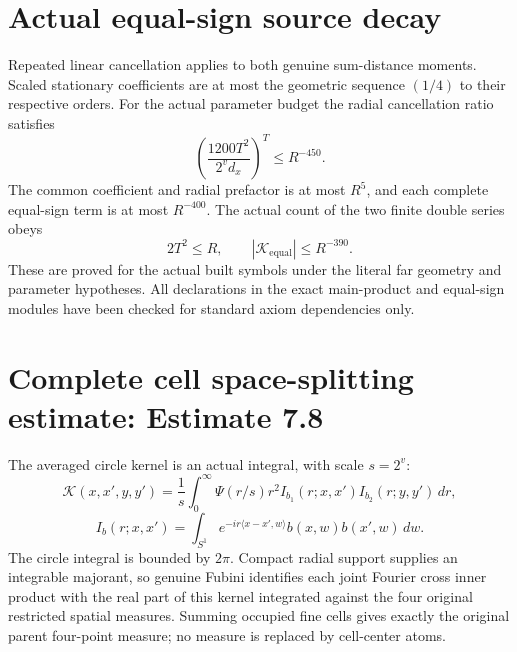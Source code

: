 \documentclass[11pt]{article}
\begin{document}
\newpage
\section*{Actual equal-sign source decay}
Repeated linear cancellation applies to both genuine sum-distance moments.
Scaled stationary coefficients are at most the geometric sequence $(1/4)$
to their respective orders. For the actual parameter budget the radial
cancellation ratio satisfies
\[
\left(\frac{1200T^2}{2^v d_x}\right)^T\le R^{-450}.
\]
The common coefficient and radial prefactor is at most $R^5$, and each
complete equal-sign term is at most $R^{-400}$. The actual count of the two
finite double series obeys
\[
2T^2\le R,\qquad |\mathcal K_{\mathrm{equal}}|\le R^{-390}.
\]
These are proved for the actual built symbols under the literal far geometry
and parameter hypotheses. All declarations in the exact main-product and
equal-sign modules have been checked for standard axiom dependencies only.

\newpage
\section*{Complete cell space-splitting estimate: Estimate 7.8}
The averaged circle kernel is an actual integral, with scale $s=2^v$:
\[
\mathcal K(x,x',y,y')=
\frac1s\int_0^\infty\Psi(r/s)r^2
I_{b_1}(r;x,x')I_{b_2}(r;y,y')\,dr,
\]
\[
I_b(r;x,x')=\int_{S^1}e^{-ir\langle x-x',w\rangle}
 b(x,w)b(x',w)\,dw.
\]
The circle integral is bounded by $2\pi$. Compact radial support supplies an
integrable majorant, so genuine Fubini identifies each joint Fourier cross
inner product with the real part of this kernel integrated against the four
original restricted spatial measures. Summing occupied fine cells gives
exactly the original parent four-point measure; no measure is replaced by
cell-center atoms.
\end{document}

